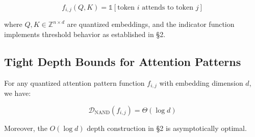 \[






f_{i,j}(Q,K) = \mathbb{1}[\text{token } i \text{ attends to token } j]






\]






where $Q,K \in \mathbb{Z}^{n \times d}$ are quantized embeddings, and the indicator function implements threshold behavior as established in §2.













\subsection{Tight Depth Bounds for Attention Patterns}













\begin{theorem}






For any quantized attention pattern function $f_{i,j}$ with embedding dimension $d$, we have:






\[






\mathcal{D}_{\text{NAND}}(f_{i,j}) = \Theta(\log d)






\]






Moreover, the $O(\log d)$ depth construction in §2 is asymptotically optimal.






\end{theorem}













